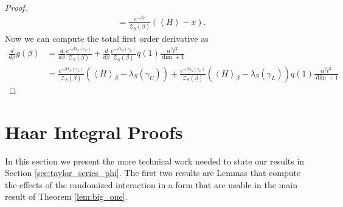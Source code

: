 \documentclass{article}
\newcommand{\parens}[1]{\left( #1 \right)}
\newcommand{\anglebrackets}[1]{\left< #1 \right>}
\newcommand{\partfun}{\mathcal{Z}}
\begin{document}
\begin{proof}
\begin{align}
        &= \frac{e^{-\beta x}}{\partfun_S(\beta)} \parens{\anglebrackets{H} - x}.
    \end{align}
    Now we can compute the total first order derivative as
    \begin{align}
        \frac{d}{d\beta} g(\beta) &= \frac{d}{d\beta} \frac{e^{-\beta \lambda_S(\gamma_U)}}{\partfun_S(\beta)} + \frac{d}{d\beta} \frac{e^{-\beta \lambda_S(\gamma_L)}}{\partfun_S(\beta)} q(1) \frac{\alpha^2 t^2}{\dim + 1} \\
        &= \frac{e^{-\beta \lambda_S(\gamma_U)}}{\partfun_S(\beta)}\parens{\anglebrackets{H}_{\beta} - \lambda_S(\gamma_U)} + \frac{e^{-\beta \lambda_S(\gamma_L)}}{\partfun_S(\beta)}\parens{\anglebrackets{H}_{\beta} - \lambda_S(\gamma_L)} q(1) \frac{\alpha^2 t^2}{\dim + 1}
    \end{align}

\end{proof}

\section{Haar Integral Proofs} \label{sec:haar_integral_appendix}

In this section we present the more technical work needed to state our results in Section \ref{sec:taylor_series_phi}. The first two results are Lemmas that compute the effects of the randomized interaction in a form that are usable in the main result of Theorem \ref{lem:big_one}.
\end{document}

